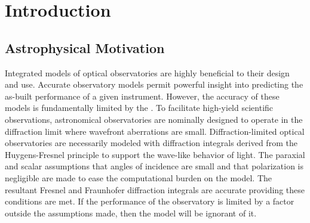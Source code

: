 \section{Introduction}
\label{sec:intro}  %
\subsection{Astrophysical Motivation}

Integrated models of optical observatories are highly beneficial to their design and use\cite{andersen_integrated_2011,Dube2022}. Accurate observatory models permit powerful insight into predicting the as-built performance of a given instrument. However, the accuracy of these models is fundamentally limited by the . To facilitate high-yield scientific observations, astronomical observatories are nominally designed to operate in the diffraction limit where wavefront aberrations are small. Diffraction-limited optical observatories are necessarily modeled with diffraction integrals derived from the Huygens-Fresnel principle to support the wave-like behavior of light. The paraxial and scalar assumptions that angles of incidence are small and that polarization is negligible\cite{goodman17} are made to ease the computational burden on the model. The resultant Fresnel and Fraunhofer diffraction integrals are accurate providing these conditions are met. If the performance of the observatory is limited by a factor outside the assumptions made, then the model will be ignorant of it. 

